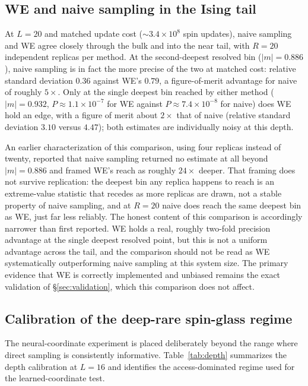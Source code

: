 \documentclass[a4paper,fleqn]{cas-sc}
\begin{document}
\subsection{WE and naive sampling in the Ising tail}\label{sec:tailreach}
At $L=20$ and matched update cost ($\sim3.4\times10^{8}$ spin updates), naive sampling and WE
agree closely through the bulk and into the near tail, with $R=20$ independent replicas per
method. At the second-deepest resolved bin ($|m|=0.886$), naive sampling is in fact the more
precise of the two at matched cost: relative standard deviation $0.36$ against WE's $0.79$, a
figure-of-merit advantage for naive of roughly $5\times$. Only at the single deepest bin
reached by either method ($|m|=0.932$, $P\approx1.1\times10^{-7}$ for WE against
$P\approx7.4\times10^{-8}$ for naive) does WE hold an edge, with a figure of merit about
$2\times$ that of naive (relative standard deviation $3.10$ versus $4.47$); both estimates are
individually noisy at this depth.

An earlier characterization of this comparison, using four replicas instead of twenty,
reported that naive sampling returned no estimate at all beyond $|m|=0.886$ and framed WE's
reach as roughly $24\times$ deeper. That framing does not survive replication: the deepest bin
any replica happens to reach is an extreme-value statistic that recedes as more replicas are
drawn, not a stable property of naive sampling, and at $R=20$ naive does reach the same
deepest bin as WE, just far less reliably. The honest content of this comparison is
accordingly narrower than first reported. WE holds a real, roughly two-fold precision
advantage at the single deepest resolved point, but this is not a uniform advantage across the
tail, and the comparison should not be read as WE systematically outperforming naive sampling
at this system size. The primary evidence that WE is correctly implemented and unbiased
remains the exact validation of \S\ref{sec:validation}, which this comparison does not affect.

\subsection{Calibration of the deep-rare spin-glass regime}\label{sec:depth}
The neural-coordinate experiment is placed deliberately beyond the range where direct sampling
is consistently informative. Table~\ref{tab:depth} summarizes the depth calibration at $L=16$
and identifies the access-dominated regime used for the learned-coordinate test.
\end{document}
